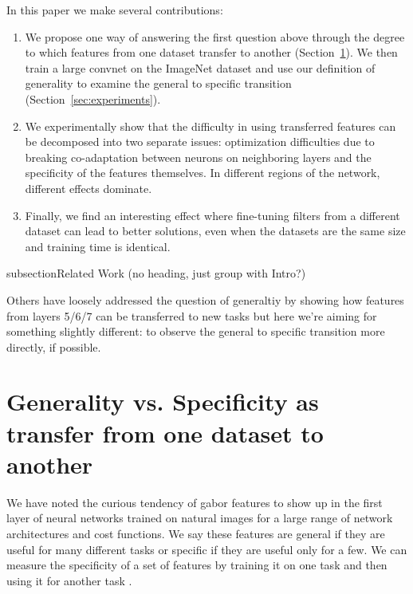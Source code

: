 In this paper we make several contributions:

\begin{enumerate}
\item We propose one way of answering the first question above through the degree to which features from one dataset transfer to another (Section~\ref{sec:definition}). We then train a large convnet on the ImageNet dataset and use our definition of generality to examine the general to specific transition (Section~\ref{sec:experiments}).
\item We experimentally show that the difficulty in using transferred features can be decomposed into two separate issues: optimization difficulties due to breaking co-adaptation between neurons on neighboring layers and the specificity of the features themselves. In different regions of the network, different effects dominate.
\item Finally, we find an interesting effect where fine-tuning filters from a different dataset can lead to better solutions, even when the datasets are the same size and training time is identical.
\end{enumerate}





subsection{Related Work (no heading, just group with Intro?)}

Others have loosely addressed the question of generaltiy by showing how features from layers 5/6/7 can be transferred to new tasks \cite{donahue+jia-2013-arxiv} but here we're aiming for something slightly different: to observe the general to specific transition more directly, if possible.






\section{Generality vs. Specificity as transfer from one dataset to another}
\label{sec:definition}

We have noted the curious tendency of gabor features to show up in the first layer of neural networks trained on natural images for a large range of network architectures and cost functions. We say these features are general if they are useful for many different tasks or specific if they are useful only for a few. We can measure the specificity of a set of features by training it on one task \dA and then using it for another task \dB.

